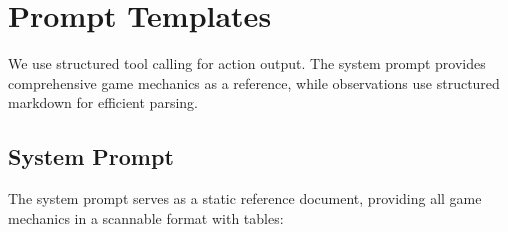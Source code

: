 \section{Prompt Templates}
\label{app:prompts}

We use structured tool calling for action output. The system prompt provides comprehensive game mechanics as a reference, while observations use structured markdown for efficient parsing.

\subsection{System Prompt}

The system prompt serves as a static reference document, providing all game mechanics in a scannable format with tables:

